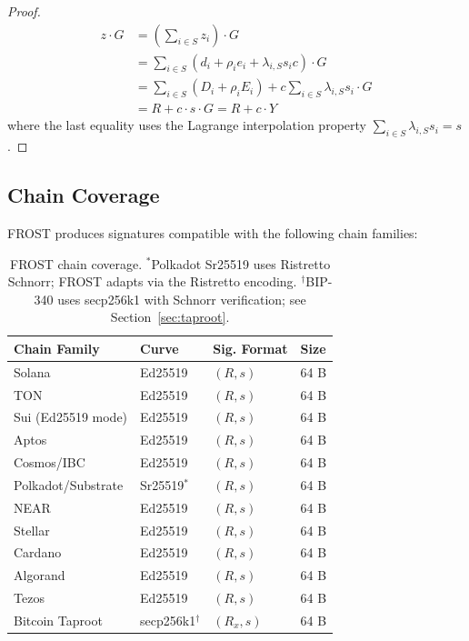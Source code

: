 \documentclass[11pt,twocolumn]{article}
\begin{document}
\begin{proof}
\begin{align*}
z \cdot G &= \left(\sum_{i \in S} z_i\right) \cdot G \\
  &= \sum_{i \in S} \left(d_i + \rho_i e_i + \lambda_{i,S} s_i c\right) \cdot G \\
  &= \sum_{i \in S} (D_i + \rho_i E_i) + c \sum_{i \in S} \lambda_{i,S} s_i \cdot G \\
  &= R + c \cdot s \cdot G = R + c \cdot Y
\end{align*}
where the last equality uses the Lagrange interpolation property
$\sum_{i \in S} \lambda_{i,S} s_i = s$.
\end{proof}

\subsection{Chain Coverage}

FROST produces signatures compatible with the following chain families:

\begin{table}[H]
\centering
\small
\begin{tabular}{@{}llll@{}}
\toprule
\textbf{Chain Family} & \textbf{Curve} & \textbf{Sig. Format} & \textbf{Size} \\
\midrule
Solana & Ed25519 & $(R, s)$ & 64 B \\
TON & Ed25519 & $(R, s)$ & 64 B \\
Sui (Ed25519 mode) & Ed25519 & $(R, s)$ & 64 B \\
Aptos & Ed25519 & $(R, s)$ & 64 B \\
Cosmos/IBC & Ed25519 & $(R, s)$ & 64 B \\
Polkadot/Substrate & Sr25519${}^*$ & $(R, s)$ & 64 B \\
NEAR & Ed25519 & $(R, s)$ & 64 B \\
Stellar & Ed25519 & $(R, s)$ & 64 B \\
Cardano & Ed25519 & $(R, s)$ & 64 B \\
Algorand & Ed25519 & $(R, s)$ & 64 B \\
Tezos & Ed25519 & $(R, s)$ & 64 B \\
Bitcoin Taproot & secp256k1${}^\dagger$ & $(R_x, s)$ & 64 B \\
\bottomrule
\end{tabular}
\caption{FROST chain coverage. ${}^*$Polkadot Sr25519 uses Ristretto Schnorr; FROST
adapts via the Ristretto encoding. ${}^\dagger$BIP-340 uses secp256k1 with Schnorr
verification; see Section~\ref{sec:taproot}.}
\label{tab:frost-chains}
\end{table}
\end{document}
